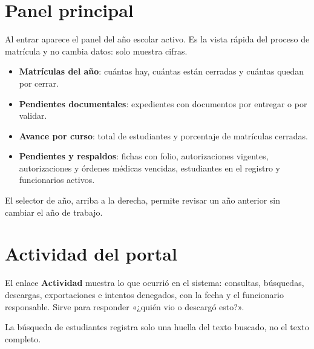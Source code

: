\section{Panel principal}

Al entrar aparece el panel del año escolar activo. Es la vista rápida del
proceso de matrícula y no cambia datos: solo muestra cifras.


\begin{itemize}[leftmargin=*,itemsep=0.2em]
\item \textbf{Matrículas del año}: cuántas hay, cuántas están cerradas y
  cuántas quedan por cerrar.
\item \textbf{Pendientes documentales}: expedientes con documentos por
  entregar o por validar.
\item \textbf{Avance por curso}: total de estudiantes y porcentaje de
  matrículas cerradas.
\item \textbf{Pendientes y respaldos}: fichas con folio, autorizaciones
  vigentes, autorizaciones y órdenes médicas vencidas, estudiantes en el
  registro y funcionarios activos.
\end{itemize}

El selector de año, arriba a la derecha, permite revisar un año anterior sin
cambiar el año de trabajo.

\section{Actividad del portal}

El enlace \textbf{Actividad} muestra lo que ocurrió en el sistema: consultas,
búsquedas, descargas, exportaciones e intentos denegados, con la fecha y el
funcionario responsable. Sirve para responder «¿quién vio o descargó esto?».


La búsqueda de estudiantes registra solo una huella del texto buscado, no el
texto completo.
